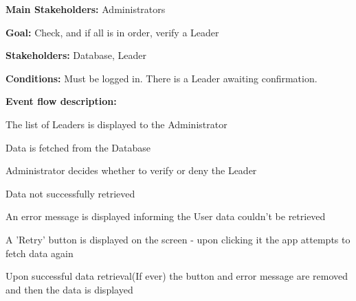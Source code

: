				\noindent {}
				\begin{packed_item}
					\item \textbf{Main Stakeholders:} Administrators
					\item \textbf{Goal:} Check, and if all is in order, verify a Leader
					\item \textbf{Stakeholders:} Database, Leader
					\item \textbf{Conditions:} Must be logged in. There is a Leader awaiting confirmation.
					\item \textbf{Event flow description: }
					\begin{packed_enum}
						\item The list of Leaders is displayed to the Administrator
						\item Data is fetched from the Database
						\item Administrator decides whether to verify or deny the Leader
					\end{packed_enum}
					
					\begin{packed_item}
						\item[2.a] Data not successfully retrieved
						\item[] \begin{packed_enum}
							\item An error message is displayed informing the User data couldn't be retrieved
							\item A 'Retry' button is displayed on the screen - upon clicking it the app attempts to fetch data again
							\item Upon successful data retrieval(If ever) the button and error message are removed and then the data is displayed
						\end{packed_enum}
					\end{packed_item}
				\end{packed_item}
			
